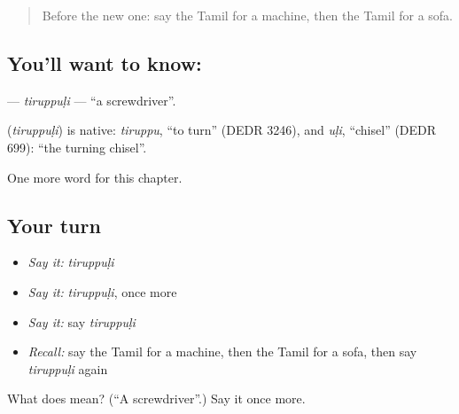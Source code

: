 \label{lesson:TA-C276-tiruppuli}



\begin{quote}
Before the new one: say the Tamil for a machine, then the Tamil for a sofa.
\end{quote}

\subsection*{You'll want to know: }
\textbf{} — \emph{tiruppuḷi} — \textquotedblleft{}a screwdriver\textquotedblright{}.

\begin{cousinweb}
\textbf{} (\emph{tiruppuḷi}) is native: \emph{tiruppu}, \textquotedblleft{}to turn\textquotedblright{} (DEDR 3246), and \emph{uḷi}, \textquotedblleft{}chisel\textquotedblright{} (DEDR 699): \textquotedblleft{}the turning chisel\textquotedblright{}.
\end{cousinweb}

\begin{grammarlens}[title={What you've built}]
One more word for this chapter.
\end{grammarlens}

\subsection*{Your turn}
\begin{itemize}
\raggedright
  \item \emph{Say it:} \emph{tiruppuḷi}
  \item \emph{Say it:} \emph{tiruppuḷi}, once more
  \item \emph{Say it:} say \emph{tiruppuḷi}
  \item \emph{Recall:} say the Tamil for a machine, then the Tamil for a sofa, then say \emph{tiruppuḷi} again
\end{itemize}

\begin{tcolorbox}[breakable,colback=teal!4,colframe=teal!35!black,title={Before you move on}]
What does  mean? (\textquotedblleft{}A screwdriver\textquotedblright{}.) Say it once more.
\end{tcolorbox}
